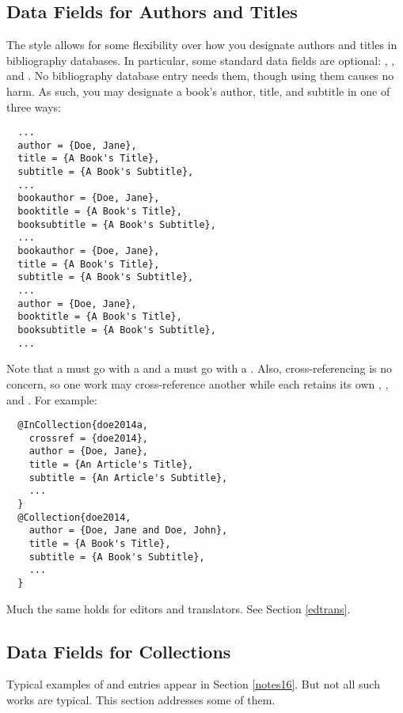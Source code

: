 \documentclass[11pt,letterpaper,oneside]{article}
\begin{document}
\subsection{Data Fields for Authors and Titles}
\label{authtitles}

The style allows for some flexibility over how you designate authors
and titles in bibliography databases. In particular, some standard
data fields are optional: , ,
and . No bibliography database entry needs
them, though using them causes no harm. As such, you may designate a
book's author, title, and subtitle in one of three ways:

\begin{lstlisting}
  ...
  author = {Doe, Jane},
  title = {A Book's Title},
  subtitle = {A Book's Subtitle},
  ...
  bookauthor = {Doe, Jane},
  booktitle = {A Book's Title},
  booksubtitle = {A Book's Subtitle},
  ...
  bookauthor = {Doe, Jane},
  title = {A Book's Title},
  subtitle = {A Book's Subtitle},
  ...
  author = {Doe, Jane},
  booktitle = {A Book's Title},
  booksubtitle = {A Book's Subtitle},
  ...
\end{lstlisting}

\noindent Note that a  must go with a
 and a  must go with a
. Also, cross-referencing is no concern, so one
work may cross-reference another while each retains its own
, , and . For
example:

\begin{lstlisting}
  @InCollection{doe2014a,
    crossref = {doe2014},
    author = {Doe, Jane},
    title = {An Article's Title},
    subtitle = {An Article's Subtitle},
    ...
  }
  @Collection{doe2014,
    author = {Doe, Jane and Doe, John},
    title = {A Book's Title},
    subtitle = {A Book's Subtitle},
    ...
  }
\end{lstlisting}

\noindent Much the same holds for editors and translators. See Section
\ref{edtrans}.

\subsection{Data Fields for Collections}
\label{collect}

Typical examples of  and 
entries appear in Section \ref{notes16}. But not all such works are
typical. This section addresses some of them.
\end{document}
